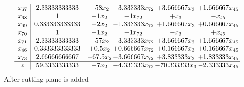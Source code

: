 \documentclass[11pt]{article}
\begin{document}
\[\begin{array}{c| c c@{\hskip 2pt} c@{\hskip 2pt} c@{\hskip 2pt} c@{\hskip 2pt} }
 x_{67}   &  2.33333333333 & -58 x_{2} & -3.333333 x_{72} & + 3.666667 x_{3} & + 1.666667 x_{45}\\
 x_{68}   &  1 & -1 x_{2} & + 1 x_{72} & +  x_{3} & - x_{45}\\
 x_{69}   &  0.333333333333 & -2 x_{2} & -1.333333 x_{72} & + 1.666667 x_{3} & + 0.666667 x_{45}\\
 x_{70}   &  1 & -1 x_{2} & + 1 x_{72} & - x_{3} & +  x_{45}\\
 x_{71}   &  2.33333333333 & -57 x_{2} & -3.333333 x_{72} & + 3.666667 x_{3} & + 1.666667 x_{45}\\
 x_{46}   &  0.333333333333 & + 0.5 x_{2} & + 0.666667 x_{72} & + 0.166667 x_{3} & + 0.166667 x_{45}\\
 x_{73}   &  2.66666666667 & -67.5 x_{2} & -3.666667 x_{72} & + 3.833333 x_{3} & + 1.833333 x_{45}\\
\hline
z    &  59.3333333333 & -7 x_{2} & -4.333333 x_{72} & -70.333333 x_{3} & -2.333333 x_{45}\\
\end{array}\]
 After cutting plane is added 
\end{document}
